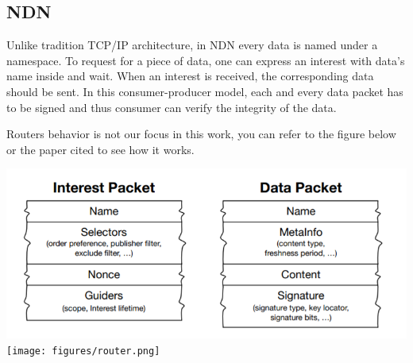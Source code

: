 \documentclass[a0,portrait]{poster}
\begin{document}
\begin{multicols}{2}
\subsection*{NDN\cite{zhang2014named}}
\par
	Unlike tradition TCP/IP architecture, in NDN every data is named under a namespace. 
	To request for a piece of data, one can express an interest with data's name inside and wait.
	When an interest is received, the corresponding data should be sent. 
	In this consumer-producer model, each and every data packet has to be signed and thus consumer can verify the integrity of the data.
\par
	Routers behavior is not our focus in this work, you can refer to the figure below or the paper cited to see how it works.
\par
\begin{minipage}[b]{0.55\linewidth}
	\includegraphics[width=\linewidth]{figures/packet.png}
	\texttt{[image: figures/router.png]}
\end{minipage}
\begin{minipage}[b]{0.45\linewidth}

\end{minipage}
\end{multicols}
\end{document}

